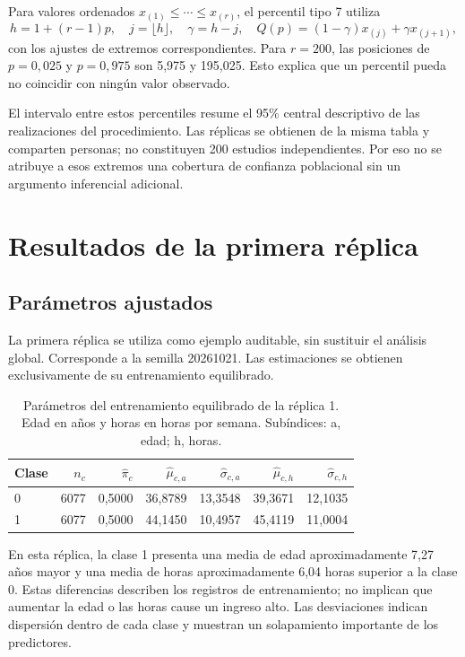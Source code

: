 \documentclass[11pt,a4paper]{article}
\begin{document}
Para valores ordenados $x_{(1)}\leq\cdots\leq x_{(r)}$, el percentil tipo 7 utiliza \cite{quantile}
\begin{equation}
h=1+(r-1)p,\quad j=\lfloor h\rfloor,\quad\gamma=h-j,\quad
Q(p)=(1-\gamma)x_{(j)}+\gamma x_{(j+1)},
\end{equation}
con los ajustes de extremos correspondientes. Para $r=200$, las posiciones de $p=0,025$ y $p=0,975$ son 5,975 y 195,025. Esto explica que un percentil pueda no coincidir con ningún valor observado.

El intervalo entre estos percentiles resume el 95\% central descriptivo de las realizaciones del procedimiento. Las réplicas se obtienen de la misma tabla y comparten personas; no constituyen 200 estudios independientes. Por eso no se atribuye a esos extremos una cobertura de confianza poblacional sin un argumento inferencial adicional.

\section{Resultados de la primera réplica}
\subsection{Parámetros ajustados}
La primera réplica se utiliza como ejemplo auditable, sin sustituir el análisis global. Corresponde a la semilla 20261021. Las estimaciones se obtienen exclusivamente de su entrenamiento equilibrado.

\begin{table}[H]
\centering
\caption[Parámetros del entrenamiento equilibrado de la réplica 1.]{Parámetros del entrenamiento equilibrado de la réplica 1. Edad en años y horas en horas por semana. Subíndices: a, edad; h, horas.}\label{tab:parametros}
\small
\setlength{\tabcolsep}{4pt}
\begin{tabular}{lrrrrrr}
\toprule
Clase & $n_c$ & $\widehat\pi_c$ & $\widehat\mu_{c,a}$ & $\widehat\sigma_{c,a}$ & $\widehat\mu_{c,h}$ & $\widehat\sigma_{c,h}$ \\
\midrule
0 & 6077 & 0,5000 & 36,8789 & 13,3548 & 39,3671 & 12,1035 \\
1 & 6077 & 0,5000 & 44,1450 & 10,4957 & 45,4119 & 11,0004 \\
\bottomrule
\end{tabular}
\end{table}

En esta réplica, la clase 1 presenta una media de edad aproximadamente 7,27 años mayor y una media de horas aproximadamente 6,04 horas superior a la clase 0. Estas diferencias describen los registros de entrenamiento; no implican que aumentar la edad o las horas cause un ingreso alto. Las desviaciones indican dispersión dentro de cada clase y muestran un solapamiento importante de los predictores.
\end{document}
